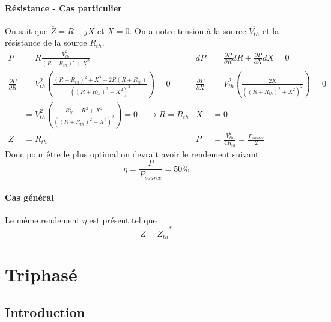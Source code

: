 \documentclass{report}
\begin{document}
\subsubsection{Résistance - Cas particulier}
On sait que $\overline{Z} = R + j X$ et $X = 0$. On a notre tension à la source $\overline{V_{th}}$ et la résistance de la source $R_{th}$. 
\begin{align*}
P &= R \frac{V_{th}^2}{(R + R_{th})^2 + X^2} & dP &= \frac{\partial P}{\partial R} dR + \frac{\partial P}{\partial X} dX = 0\\
\frac{\partial P}{\partial R} &= V_{th}^2 \left( \frac{(R + R_{th})^2 + X^2 - 2 R(R + R_{th})}{\left( (R + R_{th})^2 + X^2 \right)^2} \right) = 0 & \frac{\partial P}{\partial X} &= V_{th}^2 \left( \frac{2 X}{((R + R_{th})^2 + X^2)^2} \right) = 0\\
&= V_{th}^2 \left( \frac{R_{th}^2 - R^2 + X^2}{((R + R_{th})^2 + X^2)^2} \right) = 0 \quad \rightarrow R =R_{th} & X &= 0\\
\overline{Z} &= R_{th} & P &= \frac{V_{th}^2}{4 R_{th}} = \frac{P_{source}}{2}
\end{align*}
Donc pour être le plus optimal on devrait avoir le rendement suivant:
\begin{equation}
\eta = \frac{P}{P_{source}} = 50 \%
\end{equation}

\subsubsection{Cas général}
Le même rendement $\eta$ est présent tel que
\begin{equation}
\overline{Z} = \overline{Z_{th}}^*
\end{equation}


\chapter{Triphasé}
\section{Introduction}
\end{document}
